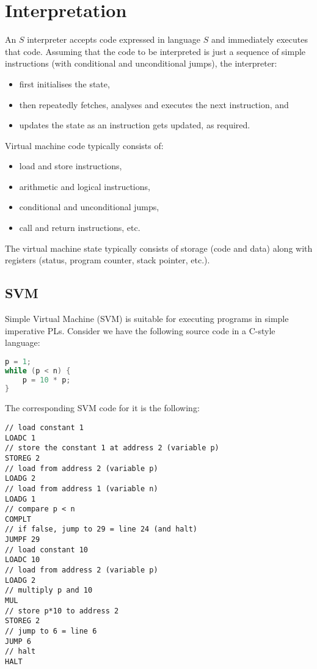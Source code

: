 \documentclass[a4paper, openany]{memoir}
\begin{document}
\newpage

\section{Interpretation}
An $S$ interpreter accepts code expressed in language $S$ and immediately executes that code. Assuming that the code to be interpreted is just a sequence of simple instructions (with conditional and unconditional jumps), the interpreter:
\begin{itemize}
    \item first initialises the state,
    \item then repeatedly fetches, analyses and executes the next instruction, and
    \item updates the state as an instruction gets updated, as required.
\end{itemize}

Virtual machine code typically consists of:
\begin{itemize}
    \item load and store instructions,
    \item arithmetic and logical instructions,
    \item conditional and unconditional jumps, 
    \item call and return instructions, etc.
\end{itemize}
The virtual machine state typically consists of storage (code and data) along with registers (status, program counter, stack pointer, etc.).

\subsection{SVM}
Simple Virtual Machine (SVM) is suitable for executing programs in simple imperative PLs. Consider we have the following source code in a C-style language:
\begin{lstlisting}[language=java]
p = 1;
while (p < n) {
    p = 10 * p;
}
\end{lstlisting}
The corresponding SVM code for it is the following:
\begin{lstlisting}[language=SVM]
// load constant 1
LOADC 1
// store the constant 1 at address 2 (variable p)
STOREG 2
// load from address 2 (variable p)
LOADG 2
// load from address 1 (variable n)
LOADG 1
// compare p < n
COMPLT
// if false, jump to 29 = line 24 (and halt)
JUMPF 29
// load constant 10
LOADC 10
// load from address 2 (variable p)
LOADG 2
// multiply p and 10
MUL
// store p*10 to address 2
STOREG 2
// jump to 6 = line 6
JUMP 6
// halt
HALT
\end{lstlisting}
\end{document}
